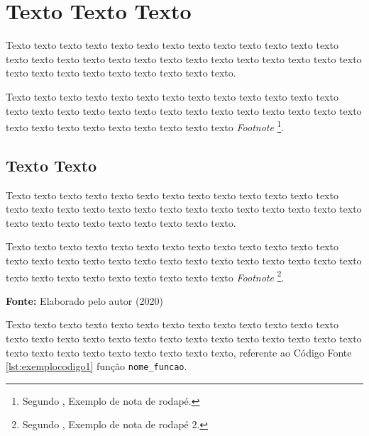 \chapter{Texto Texto Texto}
\label{chap:metodologia}

Texto texto texto texto texto texto texto texto texto texto texto texto texto texto texto texto texto texto texto texto texto texto texto texto texto texto texto texto texto texto texto texto texto texto texto texto.

Texto texto texto texto texto texto texto texto texto texto texto texto texto texto texto texto texto texto texto texto texto texto texto texto texto texto texto texto texto texto texto texto texto texto texto texto \textit{Footnote} \footnote{Segundo , Exemplo de nota de rodapé.}.

\section{Texto Texto}
\label{sec:algumlabel}

Texto texto texto texto texto texto texto texto texto texto texto texto texto texto texto texto texto texto texto texto texto texto texto texto texto texto texto texto texto texto texto texto texto texto texto texto.

Texto texto texto texto texto texto texto texto texto texto texto texto texto texto texto texto texto texto texto texto texto texto texto texto texto texto texto texto texto texto texto texto texto texto texto texto \textit{Footnote} \footnote{Segundo , Exemplo de nota de rodapé 2.}.



\hspace{4cm}
\hfill
\begin{minipage}[t]{.65\textwidth}
\ABNTEXfontereduzida\selectfont\textbf{Fonte:} Elaborado pelo autor (2020) 
\end{minipage}


Texto texto texto texto texto texto texto texto texto texto texto texto texto texto texto texto texto texto texto texto texto texto texto texto texto texto texto texto texto texto texto texto texto texto texto texto, referente ao Código Fonte \ref{lst:exemplocodigo1} função \texttt{nome\_funcao}.

